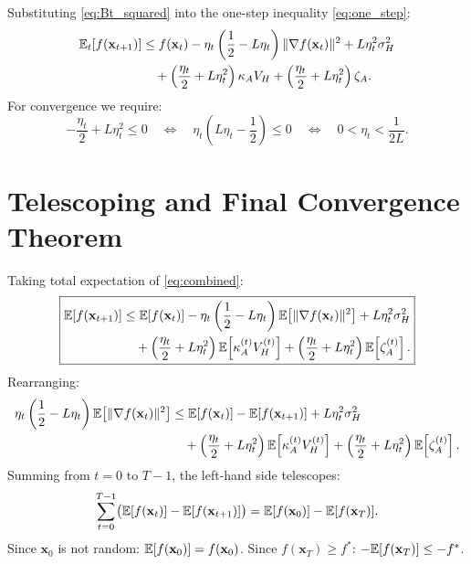 \documentclass[../main]{subfiles}
\begin{document}
Substituting \eqref{eq:Bt_squared} into the one-step inequality \eqref{eq:one_step}:
\begin{align}
    \mathbb{E}_t[f(\mathbf{x}_{t+1})] &\leq f(\mathbf{x}_t)
    - \eta_t\left(\frac{1}{2} - L\eta_t\right)\|\nabla f(\mathbf{x}_t)\|^2
    + L\eta_t^2\sigma_H^2 \nonumber\\
    &\quad + \left(\frac{\eta_t}{2} + L\eta_t^2\right)\kappa_A V_H
    + \left(\frac{\eta_t}{2} + L\eta_t^2\right)\zeta_A.
    \label{eq:combined}
\end{align}
For convergence we require:
\[
    -\frac{\eta_t}{2} + L\eta_t^2 \leq 0
    \quad\Longleftrightarrow\quad
    \eta_t\left(L\eta_t - \frac{1}{2}\right) \leq 0
    \quad\Longleftrightarrow\quad
    0 < \eta_t < \frac{1}{2L}.
\]
\section{Telescoping and Final Convergence Theorem}
\label{app:telescoping}

Taking total expectation of \eqref{eq:combined}:
\begin{equation}
\boxed{
\begin{aligned}
    \mathbb{E}[f(\mathbf{x}_{t+1})] &\leq \mathbb{E}[f(\mathbf{x}_t)]
    - \eta_t\left(\frac{1}{2} - L\eta_t\right)\mathbb{E}\!\left[\|\nabla f(\mathbf{x}_t)\|^2\right]
    + L\eta_t^2\sigma_H^2 \\
    &\quad + \left(\frac{\eta_t}{2} + L\eta_t^2\right)\mathbb{E}\!\left[\kappa_A^{(t)} V_H^{(t)}\right]
    + \left(\frac{\eta_t}{2} + L\eta_t^2\right)\mathbb{E}\!\left[\zeta_A^{(t)}\right].
\end{aligned}
}
    \label{eq:total_expect}
\end{equation}
Rearranging:
\begin{align}
    \eta_t\left(\frac{1}{2} - L\eta_t\right)\mathbb{E}\!\left[\|\nabla f(\mathbf{x}_t)\|^2\right]
    &\leq \mathbb{E}[f(\mathbf{x}_t)] - \mathbb{E}[f(\mathbf{x}_{t+1})]
    + L\eta_t^2\sigma_H^2 \nonumber\\
    &\quad + \left(\frac{\eta_t}{2} + L\eta_t^2\right)\mathbb{E}\!\left[\kappa_A^{(t)} V_H^{(t)}\right]
    + \left(\frac{\eta_t}{2} + L\eta_t^2\right)\mathbb{E}\!\left[\zeta_A^{(t)}\right].
    \label{eq:rearranged}
\end{align}
Summing from $t=0$ to $T-1$, the left-hand side telescopes:
\[
    \sum_{t=0}^{T-1}\bigl(\mathbb{E}[f(\mathbf{x}_t)] - \mathbb{E}[f(\mathbf{x}_{t+1})]\bigr) = \mathbb{E}[f(\mathbf{x}_0)] - \mathbb{E}[f(\mathbf{x}_T)].
\]
Since $\mathbf{x}_0$ is not random: $\mathbb{E}[f(\mathbf{x}_0)] = f(\mathbf{x}_0)$.
Since $f(\mathbf{x}_T) \geq f^*$: $-\mathbb{E}[f(\mathbf{x}_T)] \leq -f^*$.
\end{document}
